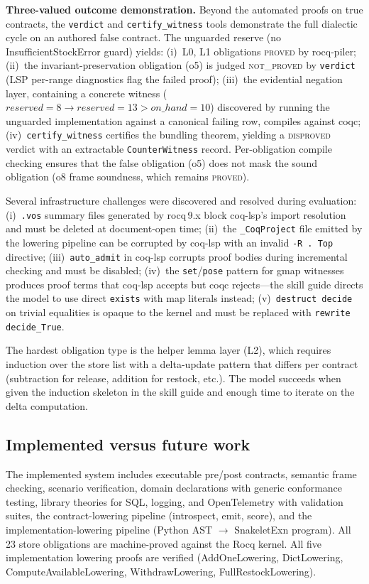 \documentclass[11pt,a4paper]{article}
\begin{document}
\textbf{Three-valued outcome demonstration.}  Beyond the automated
proofs on true contracts, the \texttt{verdict} and
\texttt{certify\_witness} tools demonstrate the full dialectic cycle on
an authored false contract.  The unguarded reserve (no
InsufficientStockError guard) yields: (i)~L0, L1 obligations
\textsc{proved} by rocq-piler; (ii)~the invariant-preservation
obligation (o5) is judged \textsc{not\_proved} by \texttt{verdict}
(LSP per-range diagnostics flag the failed proof); (iii)~the
evidential negation layer, containing a concrete witness
($\mathit{reserved}=8 \to \mathit{reserved}=13 >
\mathit{on\_hand}=10$) discovered by running the unguarded
implementation against a canonical failing row, compiles against coqc;
(iv)~\texttt{certify\_witness} certifies the bundling theorem, yielding
a \textsc{disproved} verdict with an extractable
\texttt{CounterWitness} record.  Per-obligation compile checking
ensures that the false obligation (o5) does not mask the sound
obligation (o8 frame soundness, which remains \textsc{proved}).

Several infrastructure challenges were discovered and resolved during
evaluation: (i)~\texttt{.vos} summary files generated by rocq\,9.x
block coq-lsp's import resolution and must be deleted at document-open
time; (ii)~the \texttt{\_CoqProject} file emitted by the lowering
pipeline can be corrupted by coq-lsp with an invalid \texttt{-R . Top}
directive; (iii)~\texttt{auto\_admit} in coq-lsp corrupts proof bodies
during incremental checking and must be disabled; (iv)~the
\texttt{set}/\texttt{pose} pattern for gmap witnesses produces proof
terms that coq-lsp accepts but coqc rejects---the skill guide directs
the model to use direct \texttt{exists} with map literals instead;
(v)~\texttt{destruct decide} on trivial equalities is opaque to the
kernel and must be replaced with \texttt{rewrite decide\_True}.

The hardest obligation type is the helper lemma layer (L2), which
requires induction over the store list with a delta-update pattern
that differs per contract (subtraction for release, addition for
restock, etc.).  The model succeeds when given the induction skeleton
in the skill guide and enough time to iterate on the delta
computation.

\subsection{Implemented versus future work}

The implemented system includes executable pre/post contracts,
semantic frame checking, scenario verification, domain declarations
with generic conformance testing, library theories for SQL, logging,
and OpenTelemetry with validation suites, the contract-lowering
pipeline (introspect, emit, score), and the implementation-lowering
pipeline (Python AST $\to$ SnakeletExn program).  All 23 store
obligations are machine-proved against the Rocq kernel.  All five
implementation lowering proofs are verified (AddOneLowering,
DictLowering, ComputeAvailableLowering, WithdrawLowering,
FullRestockLowering).
\end{document}
